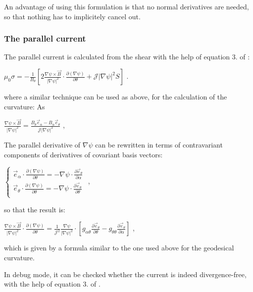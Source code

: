 An advantage of using this formulation is that no normal derivatives are needed, so that nothing has to implicitely cancel out.

\subsubsection*{The parallel current }

The parallel current is calculated from the shear with the help of equation 3. of \cite{Weyens3D} \+:

$\mu_0 \sigma = -\frac{1}{B_\theta} \left[ 2 \frac{\nabla \psi \times \vec{B}}{\left|\nabla \psi\right|^2} \cdot \frac{\partial \left(\nabla \psi\right)}{\partial \theta} + \mathcal{J} \left|\nabla \psi\right|^2 S \right]$ .

where a similar technique can be used as above, for the calculation of the curvature\+: As

$\frac{\nabla \psi \times \vec{B}}{\left|\nabla \psi\right|^2} = \frac{B_\theta \vec{e}_\alpha - B_\alpha \vec{e}_\theta} {\mathcal{J} \left|\nabla\psi\right|^2}$ ,

The parallel derivative of $\nabla \psi$ can be rewritten in terms of contravariant components of derivatives of covariant basis vectors\+:

$\left\{ \begin{aligned} \vec{e}_\alpha \cdot \frac{\partial \left(\nabla \psi\right)}{\partial\theta} = - \nabla \psi \cdot \frac{\partial \vec{e}_\theta}{\partial \alpha} \\ \vec{e}_\theta \cdot \frac{\partial \left(\nabla \psi\right)}{\partial\theta} = - \nabla \psi \cdot \frac{\partial \vec{e}_\theta}{\partial \theta} \\ \end{aligned}\right. $ ,

so that the result is\+:

$\frac{\nabla \psi \times \vec{B}}{\left|\nabla \psi\right|^2} \cdot \frac{\partial \left(\nabla \psi\right)}{\partial \theta} = \frac{1}{\mathcal{J}^2} \frac{\nabla \psi}{\left|\nabla\psi\right|^2} \cdot \left[ g_{\alpha\theta} \frac{\partial \vec{e}_\theta}{\partial \theta} - g_{\theta\theta} \frac{\partial \vec{e}_\theta}{\partial \alpha} \right] $ ,

which is given by a formula similar to the one used above for the geodesical curvature.

In debug mode, it can be checked whether the current is indeed divergence-\/free, with the help of equation 3. of \cite{Weyens3D}.


